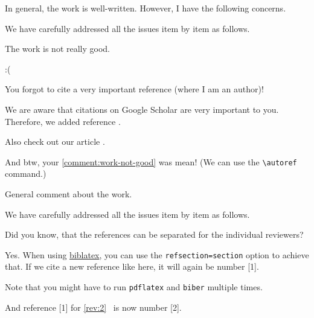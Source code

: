 \documentclass[12pt,english]{reviewresponse}
\begin{document}


\reviewer
\label{rev:2}
\begin{generalcomment}
	In general, the work is well-written. However, I have the following concerns.
\end{generalcomment}
\begin{revresponse}
	We have carefully addressed all the issues item by item as follows.
\end{revresponse}

\begin{revcomment}\label{comment:work-not-good}
	The work is not really good.
\end{revcomment}
\begin{revresponse}
	:(
\end{revresponse}

\begin{revcomment}
	You forgot to cite a very important reference (where I am an author)!
\end{revcomment}
\begin{revresponse}
	We are aware that citations on Google Scholar are very important to you.
	Therefore, we added reference \cite{ReviewerReference}.

	Also check out our article \cite{Besser2020}.
	
	And btw, your \autoref{comment:work-not-good} was mean! (We can use the \verb|\autoref| command.)
	
\end{revresponse}


\reviewer
\begin{generalcomment}
	General comment about the work.
\end{generalcomment}
\begin{revresponse}
	We have carefully addressed all the issues item by item as follows.
\end{revresponse}

\begin{revcomment}
	Did you know, that the references can be separated for the individual reviewers?
\end{revcomment}
\begin{revresponse}
	Yes. When using \href{https://www.ctan.org/pkg/biblatex}{biblatex}, you can use the \texttt{refsection=section} option to achieve that.
	If we cite a new reference like \cite{Besser2021} here, it will again be number [1].

	Note that you might have to run \texttt{pdflatex} and \texttt{biber} multiple times.

	And reference [1] for \autoref{rev:2}~\cite{ReviewerReference} is now number [2].

\end{revresponse}
\end{document}
